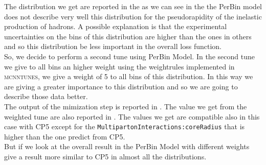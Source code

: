 The distribution we get are reported in the  as we can see in the  the PerBin model does not describe very well this distribution for the pseudorapidity of the inelastic production of hadrons. A possible explanation is that the experimental uncertainties on the bins of this distribution are higher than the ones in others and so this distribution be less important in the overall loss function.
\\
So, we decide to perform a second tune using PerBin Model. In the second tune we give to all  bins an higher weight using the weightrules implemented in \textsc{mcnntunes}, we give a weight of 5 to all bins of this distribution. In this way we are giving a greater importance to this distribution and so we are going to describe those data better.
\\
The output of the mimization step is reported in . 
The value we get from the weighted tune are also reported in . The values we get are compatible also in this case with CP5 except for the \mbox{\texttt{MultipartonInteractions:coreRadius}} that is higher than the one predict from CP5.
\\
But if we look at the overall result in 
the PerBin Model with different weights give a result more similar to CP5 in almost all the distributions. 

